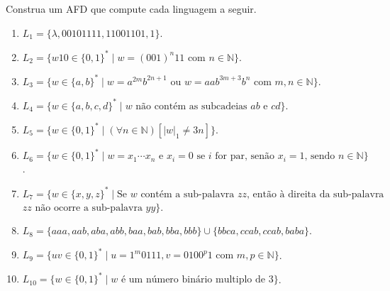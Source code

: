 \begin{problemset}
	\item Construa um AFD que compute cada linguagem a seguir.
	\begin{enumerate}
		\item $L_1 = \{\lambda, 00101111, 11001101, 1\}$.
		\item $L_2 = \{w10 \in \{0,1\}^* \mid w = (001)^n11 \text{ com } n \in \mathbb{N}\}$.
		\item $L_3 = \{w \in \{a,b\}^* \mid w = a^{2m}b^{2n+1} \text{ ou } w = aab^{3m + 3}b^n \text{ com } m,n \in \mathbb{N}\}$.
		\item $L_4 = \{w \in \{a,b,c,d\}^* \mid w \text{ não contém as subcadeias } ab \text{ e } cd\}$.
		\item $L_5 = \{w \in \{0,1\}^* \mid (\forall n \in \mathbb{N})[|w|_1 \neq 3n]\}$.
		\item $L_6 = \{w \in \{0,1\}^* \mid w = x_1\cdots x_n \text{ e } x_i = 0 \text{ se } i \text{ for par, senão } x_i = 1 \text{, sendo } n \in \mathbb{N}\}$.
		\item $L_7 = \{w \in \{x, y, z\}^* \mid \text{Se } w \text{ contém a sub-palavra } zz \text{, então à  direita da sub-palavra }$ $zz \text{ não ocorre a sub-palavra } yy \}$.
		\item $L_8 = \{aaa, aab, aba, abb, baa, bab, bba, bbb\} \cup \{bbca, ccab, ccab, baba\}$.
		\item $L_9 = \{uv \in \{0,1\}^* \mid u = 1^m0111, v = 0100^p1 \text{ com } m, p \in \mathbb{N}\}$.
		\item $L_{10} = \{w \in \{0,1\}^* \mid w \text{ é um número binário multiplo de  } 3\}$.
	\end{enumerate}


\end{problemset}
